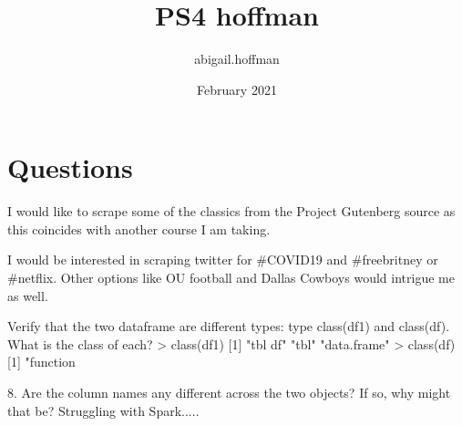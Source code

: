 \documentclass{article}
\title{PS4 hoffman}
\author{abigail.hoffman }
\date{February 2021}
\begin{document}
\maketitle

\section{Questions}
I would like to scrape some of the classics from the Project Gutenberg source as this coincides with another course I am taking. 

I would be interested in scraping twitter for #COVID19 and #freebritney or #netflix. Other options like OU football and Dallas Cowboys would intrigue me as well. 

Verify that the two dataframe are different types: type class(df1) and class(df).
What is the class of each?
> class(df1)
[1] "tbl df"     "tbl"        "data.frame"
> class(df)
[1] "function


8. Are the column names any different across the two objects? If so, why might that
be?
Struggling with Spark.....
\end{document}
